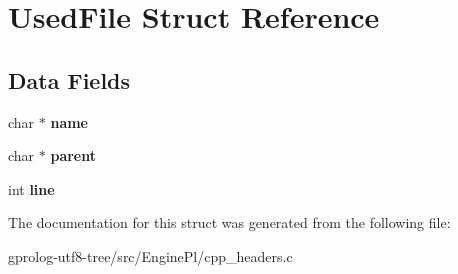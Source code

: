 \hypertarget{structUsedFile}{}\section{Used\+File Struct Reference}
\label{structUsedFile}
\subsection*{Data Fields}
\begin{DoxyCompactItemize}
\item 
char $\ast$ {\bfseries name}\hypertarget{structUsedFile_a8d4ed04924e68784f37a3f3f268ff633}{}\label{structUsedFile_a8d4ed04924e68784f37a3f3f268ff633}

\item 
char $\ast$ {\bfseries parent}\hypertarget{structUsedFile_a3bf412b1901e0513545a138bfdb9b254}{}\label{structUsedFile_a3bf412b1901e0513545a138bfdb9b254}

\item 
int {\bfseries line}\hypertarget{structUsedFile_a5a91641c98e7812d3af04c519499dd5c}{}\label{structUsedFile_a5a91641c98e7812d3af04c519499dd5c}

\end{DoxyCompactItemize}


The documentation for this struct was generated from the following file\+:\begin{DoxyCompactItemize}
\item 
gprolog-\/utf8-\/tree/src/\+Engine\+Pl/cpp\+\_\+headers.\+c\end{DoxyCompactItemize}
